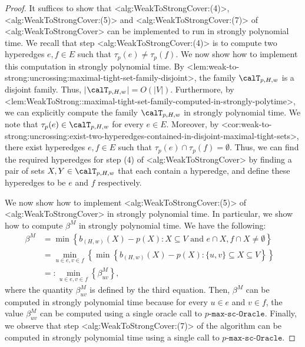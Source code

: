 \documentclass{article}
\def\Cref#1{<#1>}%
\newcommand{\functionMaximizationOracleStrongCover}[1]{\ensuremath{{#1}\text{-}\mathtt{max}\text{-}\mathtt{sc}\text{-}\mathtt{Oracle}}\xspace}
\newcommand{\maximalTightSetFamily}[1]{\ensuremath{\calT_{#1}}\xspace}
\newcommand{\maximalTightSetContainingHyperedge}[1]{\ensuremath{\tau_{#1}}\xspace}
\begin{document}
  \begin{proof}
  It suffices to show that  \Cref{alg:WeakToStrongCover:(4)}, \Cref{alg:WeakToStrongCover:(5)} and \Cref{alg:WeakToStrongCover:(7)} of \Cref{alg:WeakToStrongCover} can be implemented to run in strongly polynomial time.
  We recall that step \Cref{alg:WeakToStrongCover:(4)} is to compute two hyperedges $e, f \in E$ such that $\maximalTightSetContainingHyperedge{p}(e) \not = \maximalTightSetContainingHyperedge{p}(f)$. We now show how to implement this computation in strongly polynomial time.  By \Cref{lem:weak-to-strong:uncrossing:maximal-tight-set-family-disjoint}, the family $\maximalTightSetFamily{p, H, w}$ is a disjoint family. Thus, $|$\maximalTightSetFamily{p, H, w}$| = O(|V|)$. Furthermore,  by \Cref{lem:WeakToStrong::maximal-tight-set-family-computed-in-strongly-polytime}, we can explicitly compute the family $\maximalTightSetFamily{p, H, w}$ in strongly polynomial time. We note that $\maximalTightSetContainingHyperedge{p}(e) \in \maximalTightSetFamily{p, H, w}$ for every $e \in E$.
      Moreover, by \Cref{cor:weak-to-strong:uncrossing:exist-two-hyperedges-contained-in-disjoint-maximal-tight-sets}, there exist hyperedges $e, f \in E$ such that $\maximalTightSetContainingHyperedge{p}(e) \cap \maximalTightSetContainingHyperedge{p}(f) = \emptyset$. Thus, we can find the required hyperedges for step (4) of \Cref{alg:WeakToStrongCover} by finding a pair of sets $X, Y \in \maximalTightSetFamily{p, H, w}$ that each contain a hyperedge, and define these hyperedges to be $e$ and $f$ respectively.

      We now show how to implement \Cref{alg:WeakToStrongCover:(5)} of \Cref{alg:WeakToStrongCover} in strongly polynomial time. In particular, we show how to compute $\beta^M$ in strongly polynomial time.
We have the following:
\begin{align*}
    \beta^M& = \min\left\{b_{(H,w)}(X) - p(X) : X \subseteq V \text{ and } e \cap X, f \cap X \not = \emptyset\right\} &\\
    & = \min_{u \in e, v \in f}\left\{\min\left\{b_{(H,w)}(X) - p(X) : \{u,v\} \subseteq X \subseteq V\right\}\right\}&\\
    &=: \min_{u \in e, v \in f}\left\{\beta^M_{uv}\right\},&
\end{align*}
where the quantity $\beta^M_{uv}$ is defined by the third equation. Then, $\beta^M$ can be computed in strongly polynomial time because  for every $u \in e$ and $v \in f$, the value $\beta^M_{uv}$ can be computed using a single oracle call to \functionMaximizationOracleStrongCover{p}. Finally, we observe that step \Cref{alg:WeakToStrongCover:(7)} of the algorithm can be computed in strongly polynomial time using a single call to $\functionMaximizationOracleStrongCover{p}$.
  \end{proof}
\end{document}
